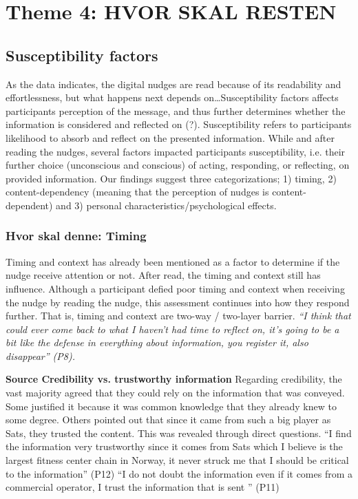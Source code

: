 \section{Theme 4: HVOR SKAL RESTEN}

\subsection{Susceptibility factors}
As the data indicates, the digital nudges are read because of its readability and effortlessness, but what happens next depends on…Susceptibility factors affects participants perception of the message, and thus further determines whether the information is considered and reflected on (?). Susceptibility refers to participants likelihood to absorb and reflect on the presented information. While and after reading the nudges, several factors impacted participants susceptibility, i.e. their further choice (unconscious and conscious) of acting, responding, or reflecting, on provided information. Our findings suggest three categorizations; 1) timing, 2) content-dependency (meaning that the perception of nudges is content-dependent) and 3) personal characteristics/psychological effects. 

\subsubsection{Hvor skal denne: Timing}
Timing and context has already been mentioned as a factor to determine if the nudge receive attention or not. After read, the timing and context still has influence. Although a participant defied poor timing and context when receiving the nudge by reading the nudge, this assessment continues into how they respond further. That is, timing and context are two-way / two-layer barrier. \textit{“I think that could ever come back to what I haven't had time to reflect on, it's going to be a bit like the defense in everything about information, you register it, also disappear” (P8).}

\textbf{Source Credibility vs. trustworthy information }
Regarding credibility, the vast majority agreed that they could rely on the information that was conveyed. Some justified it because it was common knowledge that they already knew to some degree. Others pointed out that since it came from such a big player as Sats, they trusted the content. This was revealed through direct questions. 
“I find the information very trustworthy since it comes from Sats which I believe is the largest fitness center chain in Norway, it never struck me that I should be critical to the information” (P12)
“I do not doubt the information even if it comes from a commercial operator, I trust the information that is sent ” (P11)

